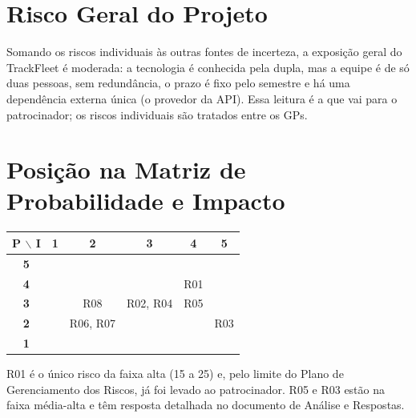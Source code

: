 \documentclass[11pt,a4paper]{article}
\begin{document}
\section{Risco Geral do Projeto}
Somando os riscos individuais às outras fontes de incerteza, a exposição geral do TrackFleet é moderada: a tecnologia é conhecida pela dupla, mas a equipe é de só duas pessoas, sem redundância, o prazo é fixo pelo semestre e há uma dependência externa única (o provedor da API). Essa leitura é a que vai para o patrocinador; os riscos individuais são tratados entre os GPs.

\section{Posição na Matriz de Probabilidade e Impacto}
\begin{center}
\small
\begin{tabular}{c|ccccc}
\toprule
\textbf{P $\backslash$ I} & \textbf{1} & \textbf{2} & \textbf{3} & \textbf{4} & \textbf{5} \\
\midrule
\textbf{5} & & & & & \\
\textbf{4} & & & & R01 & \\
\textbf{3} & & R08 & R02, R04 & R05 & \\
\textbf{2} & & R06, R07 & & & R03 \\
\textbf{1} & & & & & \\
\bottomrule
\end{tabular}
\end{center}
\noindent R01 é o único risco da faixa alta (15 a 25) e, pelo limite do Plano de Gerenciamento dos Riscos, já foi levado ao patrocinador. R05 e R03 estão na faixa média-alta e têm resposta detalhada no documento de Análise e Respostas.
\end{document}
